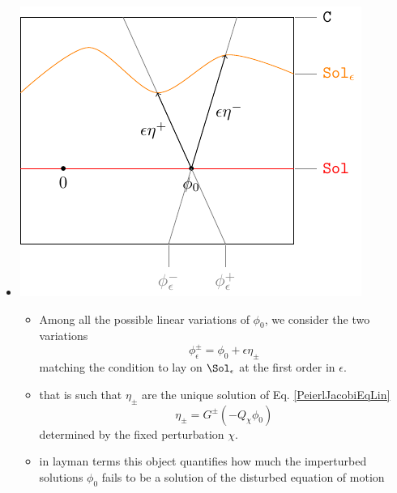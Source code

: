 \documentclass[a4paper,11pt]{scrartcl}
\begin{document}
\begin{itemize}
\item 
		\begin{minipage}{0.4\textwidth}
			\includegraphics[width=\textwidth]{../Pictures/GeometricPicture2}
		\end{minipage}
		\begin{minipage}{0.5\textwidth}
			\begin{itemize}
				\item	Among all the possible linear variations of $\phi_0$, we consider the two variations $$\phi_\epsilon^\pm = \phi_0 + \epsilon \eta_\pm$$ matching the condition to lay on $\Sol_\epsilon$ at the first order in $\epsilon$.
				\item that is such that $\eta_\pm$ are the unique solution of Eq. \ref{PeierlJacobiEqLin}
					$$ \eta_\pm = G^\pm \left( - Q_\chi \phi_0 \right) $$
					determined by the fixed perturbation $\chi$.
				\item in layman terms this object quantifies how much the imperturbed solutions $\phi_0$ fails to be a solution of the disturbed equation of motion
			\end{itemize}
		\end{minipage}


\end{itemize}
\end{document}
